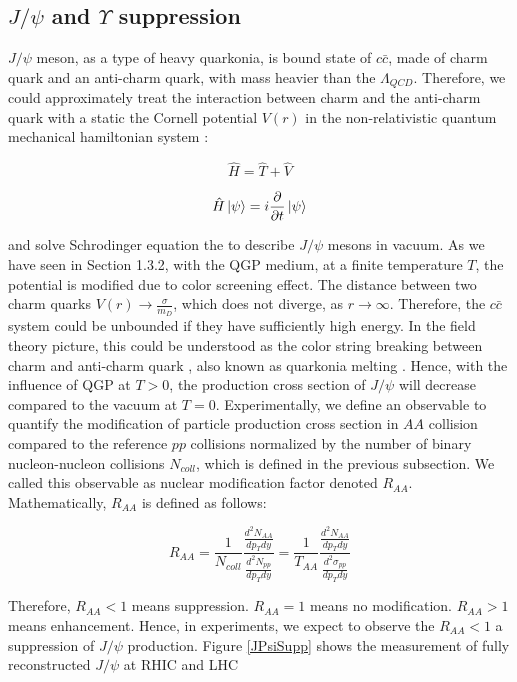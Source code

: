 \subsection{$J/\psi$ and $\Upsilon$ suppression} 

$J/\psi$ meson, as a type of heavy quarkonia, is bound state of $c\bar c$, made of charm quark and an anti-charm quark, with mass heavier than the $\Lambda_{QCD}$. Therefore, we could approximately treat the interaction between charm and the anti-charm quark with a static the Cornell potential $V(r)$ in the non-relativistic quantum mechanical hamiltonian system \cite{QuarkoniaV}: 

\begin{equation}
\hat H = \hat T + \hat V
\end{equation}

\begin{equation}
\hat H \ket{\psi} = i \frac{\partial}{\partial t}  \ket{\psi} 
\end{equation}

and solve Schrodinger equation the to describe $J/\psi$ mesons in vacuum. As we have seen in Section 1.3.2, with the QGP medium, at a finite temperature $T$, the potential is modified due to color screening effect. The distance between two charm quarks $V(r) \rightarrow \frac{\sigma}{m_D}$, which does not diverge, as $r \rightarrow \infty$. Therefore, the $c \bar c$ system could be unbounded if they have sufficiently high energy. In the field theory picture, this could be understood as the color string breaking between charm and anti-charm quark \cite{CSBQQ}, also known as quarkonia melting \cite{QQMelt}. Hence, with the influence of QGP at $T > 0$, the production cross section of $J/\psi$ will decrease compared to the vacuum at $T=0$. Experimentally, we define an observable to quantify the modification of particle production cross section in $AA$ collision compared to the reference $pp$ collisions normalized by the number of binary nucleon-nucleon collisions $N_{coll}$, which is defined in the previous subsection. We called this observable as nuclear modification factor denoted $R_{AA}$. Mathematically, $R_{AA}$ is defined as follows:

\begin{equation}
R_{AA} =\frac{1}{N_{coll}} \frac{\frac{d^2N_{AA}}{dp_T dy}}{\frac{d^2N_{pp}}{dp_T dy}} = \frac{1}{T_{AA}} \frac{\frac{d^2N_{AA}}{dp_T dy}}{\frac{d^2\sigma_{pp}}{dp_T dy}}
\end{equation}

Therefore, $R_{AA} < 1$ means suppression. $R_{AA} =1$ means no modification. $R_{AA} > 1$ means enhancement. Hence, in experiments, we expect to observe the $R_{AA} < 1$ a suppression of $J/\psi$ production. Figure \ref{JPsiSupp} shows the measurement of fully reconstructed $J/\psi$ at RHIC and LHC \cite{STARJpsi}


